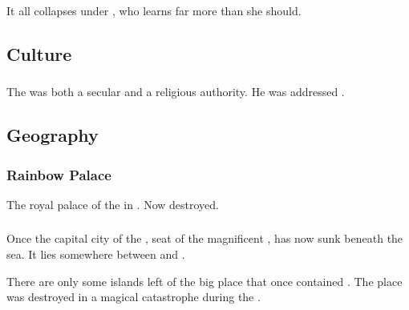 It all collapses under \Belzir, who learns far more than she should.









\subsection{Culture}





\subsubsection{\VaimonCaliph}
The \VaimonCaliph was both a secular and a religious authority. 
He was addressed .









\subsection{Geography}





\subsubsection{Rainbow Palace}
The royal palace of the \VaimonCaliph in . 
Now destroyed. 





\subsubsection{\ShiinMerodar}
\index{\ShiinMerodar}
Once the capital city of the \VaimonCaliphate, seat of the magnificent , \Merodar has now sunk beneath the sea. It lies somewhere between  and . 

There are only some islands left of the big place that once contained \ShiinMerodar. 
The place was destroyed in a magical catastrophe during the . 





